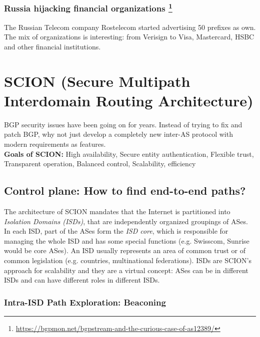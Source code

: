 \documentclass[11pt,oneside,a4paper]{article}
\begin{document}
\subsubsection[Russia hijacking financial organizations]{Russia hijacking financial organizations \footnote{\href{https://bgpmon.net/bgpstream-and-the-curious-case-of-as12389/}{https://bgpmon.net/bgpstream-and-the-curious-case-of-as12389/}}}

The Russian Telecom company Rostelecom started advertising 50 prefixes as own. The mix of organizations is interesting: from Verisign to Visa, Mastercard, HSBC and other financial institutions.

\newpage

\section{SCION \small (Secure Multipath Interdomain Routing Architecture)}

BGP security issues have been going on for years. Instead of trying to fix and patch BGP, why not just develop a completely new inter-AS protocol with modern requirements as features.\\

\noindent \textbf{Goals of SCION:} High availability, Secure entity authentication, Flexible trust, Transparent operation, Balanced control, Scalability, efficiency

\subsection{Control plane: How to find end-to-end paths?}

The architecture of SCION mandates that the Internet is partitioned into \textit{Isolation Domains (ISDs)}, that are independently organized groupings of ASes. In each ISD, part of the ASes form the \textit{ISD core}, which is responsible for managing the whole ISD and has some special functions (e.g. Swisscom, Sunrise would be core ASes). An ISD usually represents an area of common trust or of common legislation (e.g. countries, multinational federations). ISDs are SCION's approach for scalability and they are a virtual concept: ASes can be in different ISDs and can have different roles in different ISDs.

\subsubsection{Intra-ISD Path Exploration: Beaconing}
\end{document}
